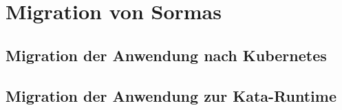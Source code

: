 \chapter{Migration von Sormas}

\section{Migration der Anwendung nach Kubernetes}

\section{Migration der Anwendung zur Kata-Runtime}